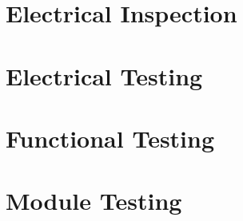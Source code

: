 \section {Electrical Inspection}

\section {Electrical Testing}

\section {Functional Testing}
 
\section {Module Testing}
